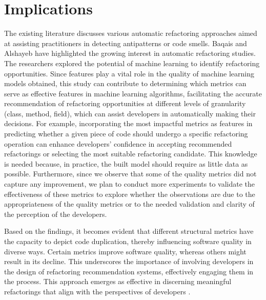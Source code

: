 \section{Implications}
\label{Section:Implication}


  The existing literature discusses various automatic refactoring approaches aimed at assisting practitioners in detecting antipatterns or code smells. Baqais and Alshayeb \citep{baqais2020automatic} have highlighted the growing interest in automatic refactoring studies. The researchers explored the potential of machine learning to identify refactoring opportunities. Since features play a vital role in the quality of machine learning models obtained, this study can contribute to determining which metrics can serve as effective features in machine learning algorithms, facilitating the accurate recommendation of refactoring opportunities at different levels of granularity (\ie class, method, field), which can assist developers in automatically making their decisions. For example, incorporating the most impactful metrics as features in predicting whether a given piece of code should undergo a specific refactoring operation can enhance developers' confidence in accepting recommended refactorings or selecting the most suitable refactoring candidate. This knowledge is needed because, in practice, the built model should require as little data as possible. Furthermore, since we observe that some of the quality metrics did not capture any improvement, we plan to conduct more experiments to validate the effectiveness of these metrics to explore whether the observations are due to the appropriateness of the quality metrics or to the needed validation and clarity of the perception of the developers.

  Based on the findings, it becomes evident that different structural metrics have the capacity to depict code duplication, thereby influencing software quality in diverse ways. Certain metrics improve software quality, whereas others might result in its decline. %
 This underscores the importance of involving developers in the design of refactoring recommendation systems, effectively engaging them in the process. This approach emerges as effective in discerning meaningful refactorings that align with the perspectives of developers \citep{hall2012supervised,bavota2012putting,pantiuchina2018improving}.


